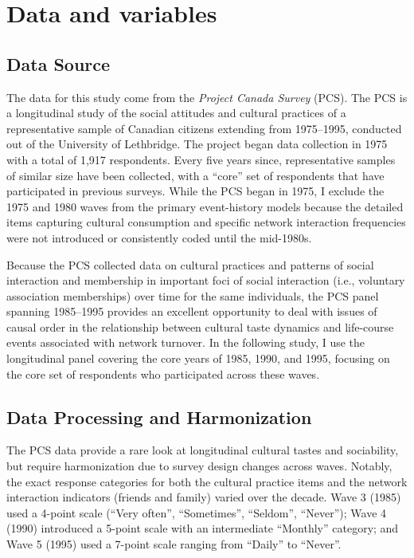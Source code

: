 \documentclass[
]{article}
\begin{document}
\section{Data and variables}\label{data-and-variables}

\subsection{Data Source}
The data for this study come from the \emph{Project Canada Survey} (PCS). The PCS is a longitudinal study of the social attitudes and cultural practices of a representative sample of Canadian citizens extending from 1975--1995, conducted out of the University of Lethbridge. The project began data collection in 1975 with a total of 1,917 respondents. Every five years since, representative samples of similar size have been collected, with a ``core'' set of respondents that have participated in previous surveys. While the PCS began in 1975, I exclude the 1975 and 1980 waves from the primary event-history models because the detailed items capturing cultural consumption and specific network interaction frequencies were not introduced or consistently coded until the mid-1980s. 

Because the PCS collected data on cultural practices and patterns of social interaction and membership in important foci of social interaction (i.e., voluntary association memberships) over time for the same individuals, the PCS panel spanning 1985--1995 provides an excellent opportunity to deal with issues of causal order in the relationship between cultural taste dynamics and life-course events associated with network turnover. In the following study, I use the longitudinal panel covering the core years of 1985, 1990, and 1995, focusing on the core set of respondents who participated across these waves. 

\subsection{Data Processing and Harmonization}
The PCS data provide a rare look at longitudinal cultural tastes and sociability, but require harmonization due to survey design changes across waves. Notably, the exact response categories for both the cultural practice items and the network interaction indicators (friends and family) varied over the decade. Wave 3 (1985) used a 4-point scale (``Very often'', ``Sometimes'', ``Seldom'', ``Never''); Wave 4 (1990) introduced a 5-point scale with an intermediate ``Monthly'' category; and Wave 5 (1995) used a 7-point scale ranging from ``Daily'' to ``Never''.
\end{document}
